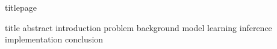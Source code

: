 \documentclass[fleqn,10pt,twoside]{article}
\begin{document}
  {titlepage}

  \cleardoublepage
  \thispagestyle{sectionstyle}
  \tableofcontents

  \cleardoublepage
  \thispagestyle{sectionstyle}
  {title}
  \bigskip
  {abstract}
  \bigskip
  {introduction}
  {problem}
  {background}
  {model}
  {learning}
  {inference}
  {implementation}
  {conclusion}

  \nocite{*}
  
  

\end{document}

